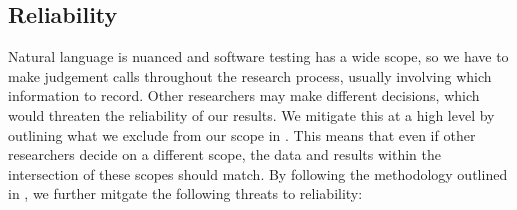 \subsection{Reliability}\label{rel-valid}
Natural language is nuanced and software testing has a wide scope, so we have
to make judgement calls throughout the research process, usually involving
which information to record. Other researchers may make different decisions,
which would threaten the reliability of our results. We mitigate this at a high
level by outlining what we exclude from our scope in . This
means that even if other researchers decide on a different scope, the data and
results within the intersection of these scopes should match. By following the
methodology outlined in , we further mitgate the following
threats to reliability:

